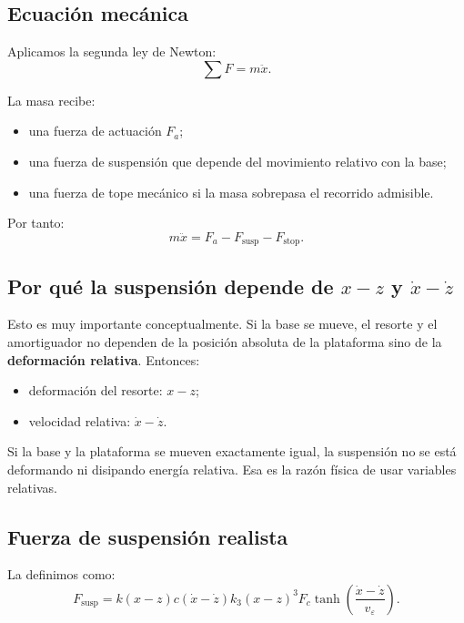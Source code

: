 \documentclass[11pt]{article}
\begin{document}
\subsection{Ecuaci\'on mec\'anica}

Aplicamos la segunda ley de Newton:
\[
\sum F = m\ddot{x}.
\]

La masa recibe:

\begin{itemize}[leftmargin=1.2cm]
\item una fuerza de actuaci\'on $F_a$;
\item una fuerza de suspensi\'on que depende del movimiento relativo con la base;
\item una fuerza de tope mec\'anico si la masa sobrepasa el recorrido admisible.
\end{itemize}

Por tanto:
\begin{equation}
m\ddot{x} = F_a - F_{\text{susp}} - F_{\text{stop}}.
\label{eq:newton}
\end{equation}

\subsection{Por qu\'e la suspensi\'on depende de $x-z$ y $\dot{x}-\dot{z}$}

Esto es muy importante conceptualmente. Si la base se mueve, el resorte y el amortiguador no dependen de la posici\'on absoluta de la plataforma sino de la \textbf{deformaci\'on relativa}. Entonces:

\begin{itemize}[leftmargin=1.2cm]
\item deformaci\'on del resorte: $x-z$;
\item velocidad relativa: $\dot{x}-\dot{z}$.
\end{itemize}

Si la base y la plataforma se mueven exactamente igual, la suspensi\'on no se est\'a deformando ni disipando energ\'ia relativa. Esa es la raz\'on f\'isica de usar variables relativas.

\subsection{Fuerza de suspensi\'on realista}

La definimos como:
\begin{equation}
F_{\text{susp}} =
k(x-z)
c(\dot{x}-\dot{z})
k_3(x-z)^3
F_c\tanh\left(\frac{\dot{x}-\dot{z}}{v_\varepsilon}\right).
\label{eq:fsusp}
\end{equation}
\end{document}
